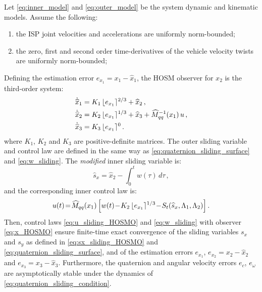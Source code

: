 \begin{theorem}

Let \eqref{eq:inner_model} and \eqref{eq:outer_model} be the system dynamic and kinematic models.
%
Assume the following:
%
\begin{enumerate}[label=(\roman*)]
%
\item the ISP joint velocities and accelerations are uniformly norm-bounded; \label{hosm_assump:1}
%
\item the zero, first and second order time-derivatives of the vehicle velocity twists are uniformly norm-bounded; \label{hosm_assump:2}
%
\end{enumerate}
%
Defining the estimation error $e_{x_1} = x_1 - \hat{x}_1$, the HOSM observer for $x_2$ is the third-order system:
%
\begin{align}
\dot{\widehat{x}}_1 &= K_1 \, \lfloor e_{x_1} \rceil^{2/3} + \widehat{x}_2 \,, \nonumber \\
\dot{\widehat{x}}_2 &= K_2 \, \lfloor e_{x_1} \rceil^{1/3} + \widehat{x}_3 + \widehat{M}^{-1}_{qq}(x_1) \, u \,, \nonumber \\
\dot{\widehat{x}}_3 &= K_3 \, \lfloor e_{x_1} \rceil^{0} \,.
\label{eq:x_HOSMO}
\end{align}
%
where $K_1$, $K_2$ and $K_3$ are positive-definite matrices.
%
The outer sliding variable and control law are defined in the same way as \eqref{eq:quaternion_sliding_surface} and \eqref{eq:w_sliding}.
%
The {\it modified} inner sliding variable is:
%
\begin{equation}
\widehat{s}_x = \widehat{x}_2 - \int^t_0{w(\tau)} \, d\tau \,,
\label{eq:sx_sliding_HOSMO}
\end{equation}
%
and the corresponding inner control law is:
%
\begin{equation}
u(t) \!=\! \widehat{M}_{qq}(x_1) \left[ w(t) \!-\! K_2 \, \lfloor e_{x_1} \rceil^{1/3} \!-\! S_t(\widehat{s}_x,\Lambda_1,\Lambda_2) \right].
\label{eq:u_sliding_HOSMO}
\end{equation}
%
Then, control laws \eqref{eq:u_sliding_HOSMO} and \eqref{eq:w_sliding} with observer \eqref{eq:x_HOSMO} ensure finite-time exact convergence of the sliding variables $s_x$ and $s_y$ as defined in \eqref{eq:sx_sliding_HOSMO} and \eqref{eq:quaternion_sliding_surface}, and of the estimation errors $e_{x_1}$, $e_{x_2} = x_2 - \widehat{x}_2$ and $e_{x_3} = x_3 - \widehat{x}_3$. Furthermore, the quaternion and angular velocity errors $e_c$, $e_\omega$ are asymptotically stable under the dynamics of \eqref{eq:quaternion_sliding_condition}. 

\end{theorem}
